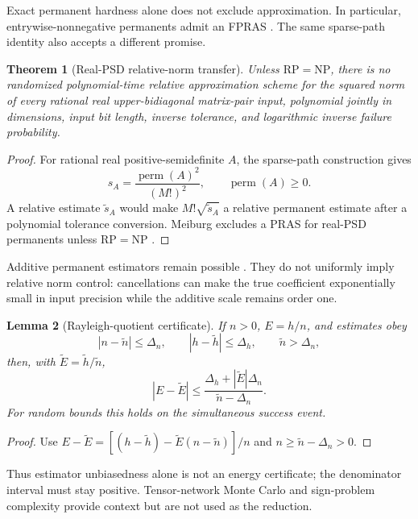 \documentclass[11pt]{article}
\newtheorem{theorem}{Theorem}[section]
\newtheorem{lemma}[theorem]{Lemma}
\theoremstyle{definition}
\newcommand{\perm}{\operatorname{perm}}
\begin{document}
Exact permanent hardness alone does not exclude approximation.  In particular,
entrywise-nonnegative permanents admit an FPRAS
\cite{JerrumSinclairVigoda2004PermanentFPRAS}.  The same sparse-path identity also
accepts a different promise.

\begin{theorem}[Real-PSD relative-norm transfer]
Unless $\mathrm{RP}=\mathrm{NP}$, there is no randomized polynomial-time
relative approximation scheme for the squared norm of every rational real
upper-bidiagonal matrix-pair input, polynomial jointly in dimensions, input
bit length, inverse tolerance, and logarithmic inverse failure probability.
\end{theorem}

\begin{proof}
For rational real positive-semidefinite $A$, the sparse-path construction gives
\[
s_A=\frac{\perm(A)^2}{(M!)^2},\qquad \perm(A)\ge0.
\]
A relative estimate
$\widetilde s_A$ would make $M!\sqrt{\widetilde s_A}$ a relative permanent
estimate after a polynomial tolerance conversion.  Meiburg excludes a PRAS
for real-PSD permanents unless $\mathrm{RP}=\mathrm{NP}$
\cite{Meiburg2023PSDPermanent}.
\end{proof}

Additive permanent estimators remain possible
\cite{AaronsonHance2014Gurvits}.  They do not uniformly imply relative norm
control: cancellations can make the true coefficient exponentially small in
input precision while the additive scale remains order one.

\begin{lemma}[Rayleigh-quotient certificate]
If $n>0$, $E=h/n$, and estimates obey
\[
 |n-\widetilde n|\le\Delta_n,\qquad
 |h-\widetilde h|\le\Delta_h,\qquad
 \widetilde n>\Delta_n,
\]
then, with $\widetilde E=\widetilde h/\widetilde n$,
\[
 |E-\widetilde E|\le
 \frac{\Delta_h+|\widetilde E|\Delta_n}
 {\widetilde n-\Delta_n}.
\]
For random bounds this holds on the simultaneous success event.
\end{lemma}

\begin{proof}
Use
$E-\widetilde E=[(h-\widetilde h)-\widetilde E(n-\widetilde n)]/n$
and $n\ge\widetilde n-\Delta_n>0$.
\end{proof}

Thus estimator unbiasedness alone is not an energy certificate; the
denominator interval must stay positive.  Tensor-network Monte Carlo
\cite{Ferris2015TNMC} and sign-problem complexity
\cite{TroyerWiese2005SignProblem} provide context but are not used as the
reduction.
\end{document}
